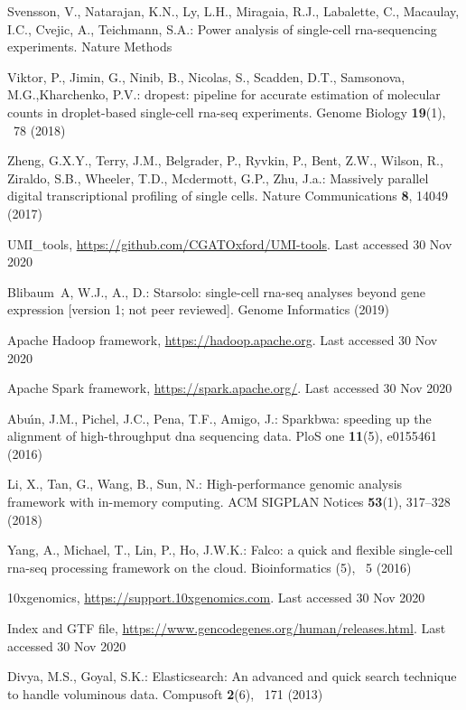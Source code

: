 \documentclass[runningheads]{llncs}
\begin{document}
\begin{thebibliography}{8}
Svensson, V., Natarajan, K.N., Ly, L.H., Miragaia, R.J., Labalette, C.,
Macaulay, I.C., Cvejic, A., Teichmann, S.A.: Power analysis of single-cell
rna-sequencing experiments. Nature Methods

Viktor, P., Jimin, G., Ninib, B., Nicolas, S., Scadden, D.T., Samsonova, M.G.,Kharchenko, P.V.: dropest: pipeline for accurate estimation of molecular
  counts in droplet-based single-cell rna-seq experiments. Genome Biology
\textbf{19}(1), ~78 (2018)

Zheng, G.X.Y., Terry, J.M., Belgrader, P., Ryvkin, P., Bent, Z.W., Wilson, R.,
Ziraldo, S.B., Wheeler, T.D., Mcdermott, G.P., Zhu, J.a.: Massively parallel
digital transcriptional profiling of single cells. Nature Communications
\textbf{8},  14049 (2017)

UMI\_tools, \url{https://github.com/CGATOxford/UMI-tools}. Last accessed 30
Nov 2020

Blibaum~A, W.J., A., D.: Starsolo: single-cell rna-seq analyses beyond gene
expression [version 1; not peer reviewed]. Genome Informatics  (2019)

Apache Hadoop framework, \url{https://hadoop.apache.org}. Last accessed 30
Nov 2020

Apache Spark framework, \url{https://spark.apache.org/}. Last accessed 30
Nov 2020

Abu{\'\i}n, J.M., Pichel, J.C., Pena, T.F., Amigo, J.: Sparkbwa: speeding up
the alignment of high-throughput dna sequencing data. PloS one
\textbf{11}(5),  e0155461 (2016)

Li, X., Tan, G., Wang, B., Sun, N.: High-performance genomic analysis framework
with in-memory computing. ACM SIGPLAN Notices  \textbf{53}(1),  317--328
(2018)

Yang, A., Michael, T., Lin, P., Ho, J.W.K.: Falco: a quick and flexible
single-cell rna-seq processing framework on the cloud. Bioinformatics (5), ~5
(2016)

10xgenomics, \url{https://support.10xgenomics.com}. Last accessed 30
Nov 2020

Index and GTF file, \url{https://www.gencodegenes.org/human/releases.html}. Last accessed 30
Nov 2020

Divya, M.S., Goyal, S.K.: Elasticsearch: An advanced and quick search technique
  to handle voluminous data. Compusoft  \textbf{2}(6), ~171 (2013)

\end{thebibliography}
\end{document}
